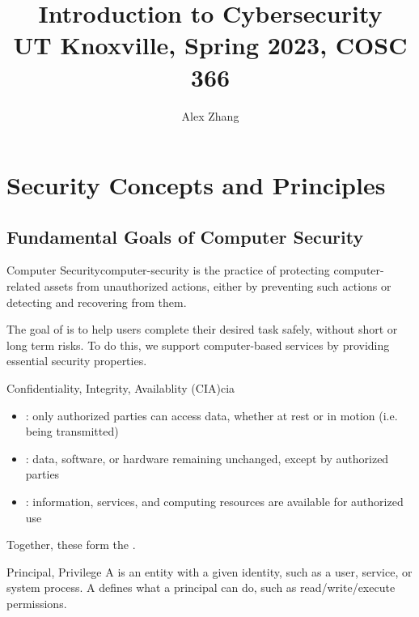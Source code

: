 \documentclass[code]{amznotes}
\title{\textbf{Introduction to Cybersecurity}\\
\large UT Knoxville, Spring 2023, COSC 366}
\author{Alex Zhang}
\begin{document}
\maketitle
\tableofcontents

\chapter{Security Concepts and Principles}

\section{Fundamental Goals of Computer Security}

\begin{dfnbox}{Computer Security}{computer-security}
     is the practice of protecting computer-related assets from unauthorized actions, either by preventing such actions or detecting and recovering from them.
\end{dfnbox}

The goal of  is to help users complete their desired task safely, without short or long term risks.  To do this, we support computer-based services by providing essential security properties.

\begin{dfnbox}{Confidentiality, Integrity, Availablity (CIA)}{cia}
    \begin{itemize}[noitemsep]
        \item {}: only authorized parties can access data, whether at rest or in motion (i.e. being transmitted)
        \item {}: data, software, or hardware remaining unchanged, except by authorized parties
        \item {}: information, services, and computing resources are available for authorized use
    \end{itemize}
    Together, these form the .
\end{dfnbox}

\begin{dfnbox}{Principal, Privilege}{}
    A  is an entity with a given identity, such as a user, service, or system process. A  defines what a principal can do, such as read/write/execute permissions.
\end{dfnbox}
\end{document}

